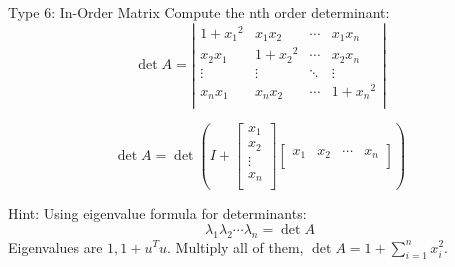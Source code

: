 \documentclass{beamer}
\begin{document}
\begin{frame}{Type 6: In-Order Matrix}
    Compute the nth order determinant:
    \begin{equation*}
        \det A=\left| \begin{matrix}
        1+{x_1}^2&		x_1x_2&		\cdots&		x_1x_n\\
        x_2x_1&		1+{x_2}^2&		\cdots&		x_2x_n\\
        \vdots&		\vdots&		\ddots&		\vdots\\
        x_nx_1&		x_nx_2&		\cdots&		1+{x_n}^2\\
    \end{matrix} \right|
    \end{equation*}

    \begin{equation*}
        \det A=\det \left( I+\left[ \begin{array}{c}
            x_1\\
            x_2\\
            \vdots\\
            x_n\\
        \end{array} \right] \left[ \begin{matrix}
            x_1&		x_2&		\cdots&		x_n\\
        \end{matrix} \right] \right)
    \end{equation*}

Hint: Using eigenvalue formula for determinants:
\begin{equation*}
\lambda _1\lambda _2\cdots \lambda _n=\det A
\end{equation*}
Eigenvalues are $1, 1+u^Tu$. Multiply all of them, $\det A=1+\sum_{i = 1}^{n} x_i^2 $.
\end{frame}
\end{document}
